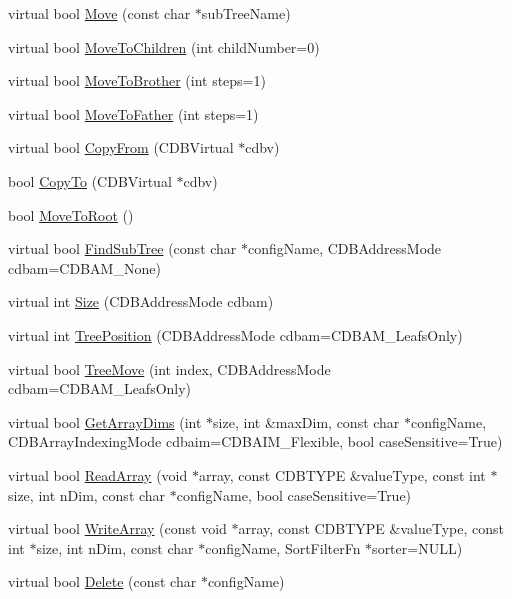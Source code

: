 \begin{DoxyCompactItemize}
\item 
virtual bool \hyperlink{classMMCDB_a1bd932558a26deb53f02825487157be5}{Move} (const char $\ast$subTreeName)
\item 
virtual bool \hyperlink{classMMCDB_a60779a37f5d8a558ec99990412b61d4c}{MoveToChildren} (int childNumber=0)
\item 
virtual bool \hyperlink{classMMCDB_aaf622ac3d828e1be4aed9353738f91aa}{MoveToBrother} (int steps=1)
\item 
virtual bool \hyperlink{classMMCDB_af80eb1914be00a4b81efeaa9b6ed883c}{MoveToFather} (int steps=1)
\item 
virtual bool \hyperlink{classMMCDB_a0ce70d1bfd4e8c2f7d577a78a6781c46}{CopyFrom} (CDBVirtual $\ast$cdbv)
\item 
bool \hyperlink{classMMCDB_a900ea4f1155eae9f815744877e0d7610}{CopyTo} (CDBVirtual $\ast$cdbv)
\item 
bool \hyperlink{classMMCDB_a6c562dc147062c4aa8410498ac83387b}{MoveToRoot} ()
\item 
virtual bool \hyperlink{classMMCDB_a27b70d1812a9443d91927c0aeb285d0b}{FindSubTree} (const char $\ast$configName, CDBAddressMode cdbam=CDBAM\_\-None)
\item 
virtual int \hyperlink{classMMCDB_a496aabebd44074232f0e60b134acc173}{Size} (CDBAddressMode cdbam)
\item 
virtual int \hyperlink{classMMCDB_ad09c66c9e5185a7a7308a704fde49c6e}{TreePosition} (CDBAddressMode cdbam=CDBAM\_\-LeafsOnly)
\item 
virtual bool \hyperlink{classMMCDB_a6b4658bebd1204230e2847f59dfcff86}{TreeMove} (int index, CDBAddressMode cdbam=CDBAM\_\-LeafsOnly)
\item 
virtual bool \hyperlink{classMMCDB_aff4a1b4ef7b7a0d52cc14003ca63d7b8}{GetArrayDims} (int $\ast$size, int \&maxDim, const char $\ast$configName, CDBArrayIndexingMode cdbaim=CDBAIM\_\-Flexible, bool caseSensitive=True)
\item 
virtual bool \hyperlink{classMMCDB_a9133b3217d6ed545915c95054ad320f6}{ReadArray} (void $\ast$array, const CDBTYPE \&valueType, const int $\ast$size, int nDim, const char $\ast$configName, bool caseSensitive=True)
\item 
virtual bool \hyperlink{classMMCDB_aecb7ea576d693233ed0d3f9decfc3fd8}{WriteArray} (const void $\ast$array, const CDBTYPE \&valueType, const int $\ast$size, int nDim, const char $\ast$configName, SortFilterFn $\ast$sorter=NULL)
\item 
virtual bool \hyperlink{classMMCDB_ad30f17ceca21b71704beab51d9c65d97}{Delete} (const char $\ast$configName)

\end{DoxyCompactItemize}
